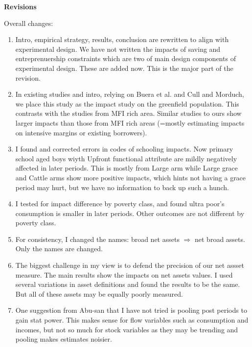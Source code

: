 \newpage
{}
\textbf{\textbf{Revisions}}

\vspace{2ex}
Overall changes:
\begin{enumerate}
\vspace{1.0ex}\setlength{\itemsep}{1.0ex}\setlength{\baselineskip}{12pt}
\item	Intro, empirical strategy, results, conclusion are rewritten to align with experimental design. We have not written the impacts of saving and entreprenuership constraints which are two of main design components of experimental design. These are added now. This is the major part of the revision.
\item	In existing studies and intro, relying on Buera et al. and Cull and Morduch, we place this study as the impact study on the greenfield population. This contrasts with the studies from MFI rich area. Similar studies to ours show larger impacts than those from MFI rich areas (=mostly estimating impacts on intensive margins or existing borrowers).
\item	I found and corrected errors in codes of schooling impacts. Now primary school aged boys wiyth \textsf{Upfront} functional attribute are mildly negatively affected in later periods. This is mostly from \textsf{Large} arm while \textsf{Large grace} and \textsf{Cattle} arms show more positive impacts, which hints not having a grace period may hurt, but we have no information to back up such a hunch.
\item	I tested for impact difference by poverty class, and found ultra poor's consumption is smaller in later periods. Other outcomes are not different by poverty class.
\item	For consistency, I changed the names: broad net assets $\Rightarrow$ net broad assets. Only the names are changed.
\item	The biggest challenge in my view is to defend the precision of our net assset measure. The main results show the impacts on net assets values. I used several variations in asset definitions and found the results to be the same. But all of these assets may be equally poorly measured. 
\item	One suggestion from Abu-san that I have not tried is pooling post periods to gain stat power. This makes sense for flow variables such as consumption and incomes, but not so much for stock variables as they may be trending and pooling makes estimates noisier. 
\end{enumerate}

